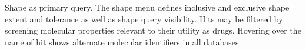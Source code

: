 \label{fig:shapefig} 
Shape as primary query. The shape menu defines inclusive and exclusive shape extent and tolerance as well as shape query visibility. Hits may be filtered by screening molecular properties relevant to their utility as drugs. Hovering over the name of hit shows alternate molecular identifiers in all databases. 